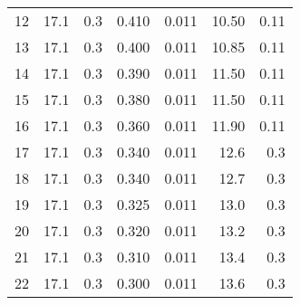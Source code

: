 \begin{tabular}{lrrrrrr}
	12 & 17.1               & 0.3                       & 0.410                & 0.011                       & 10.50              & 0.11                      \\
	13 & 17.1               & 0.3                       & 0.400                & 0.011                       & 10.85              & 0.11                      \\
	14 & 17.1               & 0.3                       & 0.390                & 0.011                       & 11.50              & 0.11                      \\
	15 & 17.1               & 0.3                       & 0.380                & 0.011                       & 11.50              & 0.11                      \\
	16 & 17.1               & 0.3                       & 0.360                & 0.011                       & 11.90              & 0.11                      \\
	17 & 17.1               & 0.3                       & 0.340                & 0.011                       & 12.6               & 0.3                       \\
	18 & 17.1               & 0.3                       & 0.340                & 0.011                       & 12.7               & 0.3                       \\
	19 & 17.1               & 0.3                       & 0.325                & 0.011                       & 13.0               & 0.3                       \\
	20 & 17.1               & 0.3                       & 0.320                & 0.011                       & 13.2               & 0.3                       \\
	21 & 17.1               & 0.3                       & 0.310                & 0.011                       & 13.4               & 0.3                       \\
	22 & 17.1               & 0.3                       & 0.300                & 0.011                       & 13.6               & 0.3                       \\
	\bottomrule
\end{tabular}
